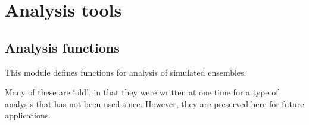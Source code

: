 \documentclass[letterpaper,10pt,english]{sphinxmanual}
\begin{document}
\section{Analysis tools}
\label{\detokenize{analysis:analysis-tools}}\label{\detokenize{analysis::doc}}

\subsection{Analysis functions}
\label{\detokenize{analysis:module-scdc.analyze}}\label{\detokenize{analysis:analysis-functions}}
This module defines functions for analysis of simulated ensembles.

Many of these are ‘old’, in that they were written at one time for a type of
analysis that has not been used since. However, they are preserved here for
future applications.
\end{document}
